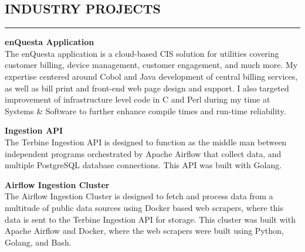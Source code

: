 \documentclass{res}
\begin{document}
\begin{resume}
\begin{comment}
			\begin{itemize} \itemsep -2pt
				\item Managed planning and presentation of lectures, bookkeeping, and dynamic of the ALEKS program
				\item Developed individual lesson plans based on statistical assessment of student performance
        \item Prepared and proctored ALEKS placement exam
			\end{itemize}
		\end{comment}

\vspace{-3pt}

		\section{{INDUSTRY PROJECTS}}
    \noindent\rule[0.5ex]{\linewidth}{1pt}        
		{\bf enQuesta Application} \hfill \vspace{5pt} \\
           The enQuesta application is a cloud-based CIS solution for utilities covering customer billing, device management, customer engagement, and much more. My expertise centered around Cobol and Java development of central billing services, as well as bill print and front-end web page design and support. I also targeted improvement of infrastructure level code in C and Perl during my time at Systems \& Software to further enhance compile times and run-time reliability.

\vspace{-5pt}
    
		{\bf Ingestion API} \hfill \vspace{5pt} \\
			The Terbine Ingestion API is designed to function as the middle man between independent programs orchestrated by Apache Airflow that collect data, and multiple PostgreSQL database connections. This API was built with Golang.
\vspace{-5pt}

		{\bf Airflow Ingestion Cluster} \hfill \vspace{5pt} \\
			The Airflow Ingestion Cluster is designed to fetch and process data from a multitude of public data sources using Docker based web scrapers, where this data is sent to the Terbine Ingestion API for storage. This cluster was built with Apache Airflow and Docker, where the web scrapers were built using Python, Golang, and Bash.
\vspace{-5pt}


\end{resume}
\end{document}
